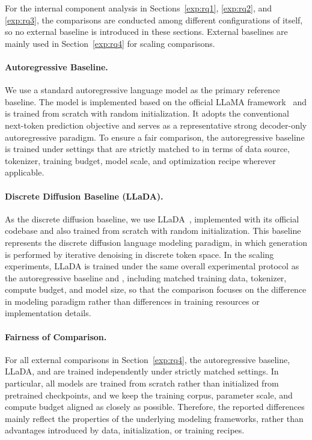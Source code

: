 For the internal component analysis in Sections~\ref{exp:rq1}, \ref{exp:rq2}, and \ref{exp:rq3}, the comparisons are conducted among different configurations of \method itself, so no external baseline is introduced in these sections. External baselines are mainly used in Section~\ref{exp:rq4} for scaling comparisons.

\paragraph{Autoregressive Baseline.}
We use a standard autoregressive language model as the primary reference baseline. The model is implemented based on the official LLaMA framework~\citep{touvron2023llama} and is trained from scratch with random initialization. It adopts the conventional next-token prediction objective and serves as a representative strong decoder-only autoregressive paradigm. To ensure a fair comparison, the autoregressive baseline is trained under settings that are strictly matched to \method in terms of data source, tokenizer, training budget, model scale, and optimization recipe wherever applicable.

\paragraph{Discrete Diffusion Baseline (LLaDA).}
As the discrete diffusion baseline, we use LLaDA~\citep{nie2025large}, implemented with its official codebase and also trained from scratch with random initialization. This baseline represents the discrete diffusion language modeling paradigm, in which generation is performed by iterative denoising in discrete token space. In the scaling experiments, LLaDA is trained under the same overall experimental protocol as the autoregressive baseline and \method, including matched training data, tokenizer, compute budget, and model size, so that the comparison focuses on the difference in modeling paradigm rather than differences in training resources or implementation details.

\paragraph{Fairness of Comparison.}
For all external comparisons in Section~\ref{exp:rq4}, the autoregressive baseline, LLaDA, and \method are trained independently under strictly matched settings. In particular, all models are trained from scratch rather than initialized from pretrained checkpoints, and we keep the training corpus, parameter scale, and compute budget aligned as closely as possible. Therefore, the reported differences mainly reflect the properties of the underlying modeling frameworks, rather than advantages introduced by data, initialization, or training recipes.

